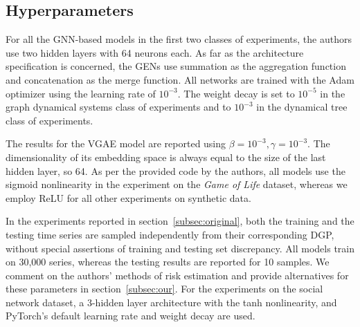 
\subsection{Hyperparameters}
For all the GNN-based models in the first two classes of experiments, the authors use two hidden layers with 64 neurons each. As far as the architecture specification is concerned, the GENs use summation as the aggregation function and concatenation as the merge function. All networks are trained with the Adam optimizer using the learning rate of $10^{-3}$. The weight decay is set to $10^{-5}$ in the graph dynamical systems class of experiments and to $10^{-3}$ in the dynamical tree class of experiments.

The results for the VGAE model are reported using $\beta=10^{-3}, \gamma=10^{-3}$. The dimensionality of its embedding space is always equal to the size of the last hidden layer, so 64. As per the provided code by the authors, all models use the sigmoid nonlinearity in the experiment on the \textit{Game of Life} dataset, whereas we employ ReLU for all other experiments on synthetic data.

In the experiments reported in section~\ref{subsec:original}, both the training and the testing time series are sampled independently from their corresponding DGP, without special assertions of training and testing set discrepancy. 
All models train on 30,000 series, whereas the testing results are reported for 10 samples. We comment on the authors' methods of risk estimation and provide alternatives for these parameters in section~\ref{subsec:our}. For the experiments on the social network dataset, a 3-hidden layer architecture with the tanh nonlinearity, and PyTorch's default learning rate and weight decay are used.



